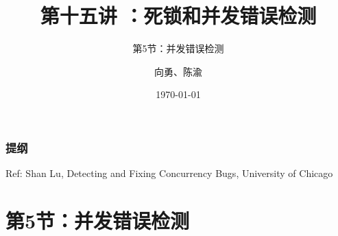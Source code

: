 


\title[第15讲]{第十五讲 ：死锁和并发错误检测} %
\subtitle{第5节：并发错误检测}
\author{向勇、陈渝} %
\date{\today} %



\begin{frame}
\titlepage %
\end{frame}

\begin{frame}
\frametitle{提纲} %
\tableofcontents %

Ref: Shan Lu, Detecting and Fixing Concurrency Bugs, University of Chicago

\end{frame}
\section{第5节：并发错误检测} %
